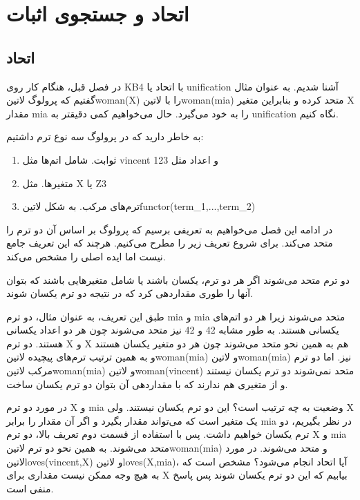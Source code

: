 \chapter{اتحاد و جستجوی اثبات}

\section{اتحاد}
در فصل قبل، هنگام کار روی KB4 با اتحاد یا unification آشنا شدیم. به عنوان مثال گفتیم که پرولوگ ‌لاتین{woman(X)} را با ‌لاتین{woman(mia)} متحد کرده و بنابراین متغیر X مقدار mia را به خود می‌گیرد. حال می‌خواهیم کمی دقیقتر به unification‌ نگاه کنیم.

به خاطر دارید که در پرولوگ سه نوع ترم داشتیم:

\begin{enumerate}
\item ثوابت. شامل اتم‌ها مثل vincent و اعداد مثل 123
\item متغیرها. مثل X یا Z3
\item ترم‌های مرکب. به شکل ‌لاتین{functor(term\_1,...,term\_2)}
\end{enumerate}

در ادامه این فصل می‌خواهیم به تعریفی برسیم که پرولوگ بر اساس آن دو ترم را متحد می‌کند. برای شروع تعریف زیر را مطرح می‌کنیم. هرچند که این تعریف جامع نیست اما ایده اصلی را مشخص می‌کند.

دو ترم متحد می‌شوند اگر هر دو ترم، یکسان باشند یا شامل متغیرهایی باشند که بتوان آنها را طوری مقداردهی کرد که در نتیجه دو ترم یکسان شوند.

طبق این تعریف، به عنوان مثال، دو ترم mia و mia متحد می‌شوند زیرا هر دو اتم‌های یکسانی هستند. به طور مشابه 42 و 42 نیز متحد می‌شوند چون هر دو اعداد یکسانی هستند. دو ترم X و X هم به همین نحو متحد می‌شوند چون هر دو متغیر یکسان هستند و به همین ترتیب ترم‌های پیچیده ‌لاتین{woman(mia)} و ‌لاتین{woman(mia)} نیز. اما دو ترم مرکب ‌لاتین{woman(mia)} و ‌لاتین{woman(vincent)} متحد نمی‌شوند دو ترم یکسان نیستند و از متغیری هم ندارند که با مقداردهی آن بتوان دو ترم یکسان ساخت.

در مورد دو ترم X و mia وضعیت به چه ترتیب است؟ این دو ترم یکسان نیستند. ولی X یک متغیر است که می‌تواند مقدار بگیرد و اگر آن مقدار را برابر mia در نظر بگیریم، دو ترم یکسان خواهیم داشت. پس با استفاده از قسمت دوم تعریف بالا، دو ترم X و mia متحد می‌شوند. به همین نحو دو ترم ‌لاتین{woman(mia)} و  متحد می‌شوند. در مورد ‌لاتین{loves(vincent,X)} و ‌لاتین{loves(X,mia)}، آیا اتحاد انجام می‌شود؟ مشخص است که به هیچ وجه ممکن نیست مقداری برای X بیابیم که این دو ترم یکسان شوند پس پاسخ منفی است.

